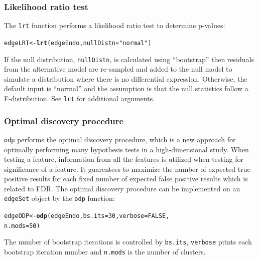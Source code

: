 \documentclass{article}\usepackage[]{graphicx}\usepackage[]{color}
\makeatletter
\newcommand{\hlnum}[1]{\textcolor[rgb]{0.686,0.059,0.569}{#1}}%
\newcommand{\hlstr}[1]{\textcolor[rgb]{0.192,0.494,0.8}{#1}}%
\newcommand{\hlstd}[1]{\textcolor[rgb]{0.345,0.345,0.345}{#1}}%
\newcommand{\hlkwb}[1]{\textcolor[rgb]{0.69,0.353,0.396}{#1}}%
\newcommand{\hlkwc}[1]{\textcolor[rgb]{0.333,0.667,0.333}{#1}}%
\newcommand{\hlkwd}[1]{\textcolor[rgb]{0.737,0.353,0.396}{\textbf{#1}}}%
\newenvironment{kframe}{%
 \def\at@end@of@kframe{}%
 \ifinner\ifhmode%
  \def\at@end@of@kframe{\end{minipage}}%
  \begin{minipage}{\columnwidth}%
 \fi\fi%
 \def\FrameCommand##1{\hskip\@totalleftmargin \hskip-\fboxsep
 \colorbox{shadecolor}{##1}\hskip-\fboxsep
     \hskip-\linewidth \hskip-\@totalleftmargin \hskip\columnwidth}%
 \MakeFramed {\advance\hsize-\width
   \@totalleftmargin\z@ \linewidth\hsize
   \@setminipage}}%
 {\par\unskip\endMakeFramed%
 \at@end@of@kframe}
\newenvironment{knitrout}{}{} %
\makeatother
\begin{document}
\subsubsection{Likelihood ratio test}
The {\tt lrt} function performs a likelihood ratio test to determine p-values:
\begin{knitrout}
\color{fgcolor}\begin{kframe}
\begin{alltt}
\hlstd{edgeLRT} \hlkwb{<-} \hlkwd{lrt}\hlstd{(edgeEndo,} \hlkwc{nullDistn} \hlstd{=} \hlstr{"normal"}\hlstd{)}
\end{alltt}
\end{kframe}
\end{knitrout}
If the null distribution, {\tt nullDistn}, is calculated using ``bootstrap'' then residuals from the alternative model are re-sampled and added to the null model to simulate a distribution where there is no differential expression. Otherwise, the default input is ``normal'' and the assumption is that the null statistics follow a F-distribution. See {\tt lrt} for additional arguments.

\subsubsection{Optimal discovery procedure}
{\tt odp} performs the optimal discovery procedure, which is a new approach for optimally performing many hypothesis tests in a high-dimensional study. When testing a feature, information from all the features is utilized when testing for significance of a feature. It guarentees to maximize the number of expected true positive results for each fixed number of expected false positive results which is related to FDR. The optimal discovery procedure can be implemented on an {\tt edgeSet} object by the {\tt odp} function:
\begin{knitrout}
\color{fgcolor}\begin{kframe}
\begin{alltt}
\hlstd{edgeODP} \hlkwb{<-} \hlkwd{odp}\hlstd{(edgeEndo,} \hlkwc{bs.its} \hlstd{=} \hlnum{30}\hlstd{,} \hlkwc{verbose} \hlstd{=} \hlnum{FALSE}\hlstd{,}
    \hlkwc{n.mods} \hlstd{=} \hlnum{50}\hlstd{)}
\end{alltt}
\end{kframe}
\end{knitrout}
The number of bootstrap iterations is controlled by {\tt bs.its}, {\tt verbose} prints each bootstrap iteration number and {\tt n.mods} is the number of clusters. 
\end{document}
